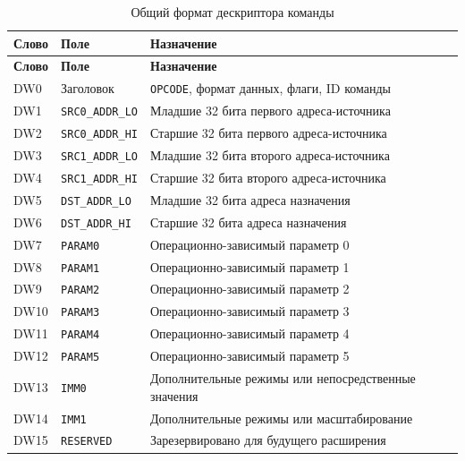 \documentclass[12pt,a4paper]{article}
\begin{document}
\small
\begin{longtable}{|C{1.2cm}|L{3.2cm}|L{9.2cm}|}
    \caption{Общий формат дескриптора команды} \\
    \hline
    \textbf{Слово} & \textbf{Поле} & \textbf{Назначение} \\
    \hline
    \endfirsthead
    \hline
    \textbf{Слово} & \textbf{Поле} & \textbf{Назначение} \\
    \hline
    \endhead
    DW0 & Заголовок & \texttt{OPCODE}, формат данных, флаги, ID команды \\
    \hline
    DW1 & \texttt{SRC0\_ADDR\_LO} & Младшие 32 бита первого адреса-источника \\
    \hline
    DW2 & \texttt{SRC0\_ADDR\_HI} & Старшие 32 бита первого адреса-источника \\
    \hline
    DW3 & \texttt{SRC1\_ADDR\_LO} & Младшие 32 бита второго адреса-источника \\
    \hline
    DW4 & \texttt{SRC1\_ADDR\_HI} & Старшие 32 бита второго адреса-источника \\
    \hline
    DW5 & \texttt{DST\_ADDR\_LO} & Младшие 32 бита адреса назначения \\
    \hline
    DW6 & \texttt{DST\_ADDR\_HI} & Старшие 32 бита адреса назначения \\
    \hline
    DW7 & \texttt{PARAM0} & Операционно-зависимый параметр 0 \\
    \hline
    DW8 & \texttt{PARAM1} & Операционно-зависимый параметр 1 \\
    \hline
    DW9 & \texttt{PARAM2} & Операционно-зависимый параметр 2 \\
    \hline
    DW10 & \texttt{PARAM3} & Операционно-зависимый параметр 3 \\
    \hline
    DW11 & \texttt{PARAM4} & Операционно-зависимый параметр 4 \\
    \hline
    DW12 & \texttt{PARAM5} & Операционно-зависимый параметр 5 \\
    \hline
    DW13 & \texttt{IMM0} & Дополнительные режимы или непосредственные значения \\
    \hline
    DW14 & \texttt{IMM1} & Дополнительные режимы или масштабирование \\
    \hline
    DW15 & \texttt{RESERVED} & Зарезервировано для будущего расширения \\
    \hline
\end{longtable}
\normalsize
\end{document}
